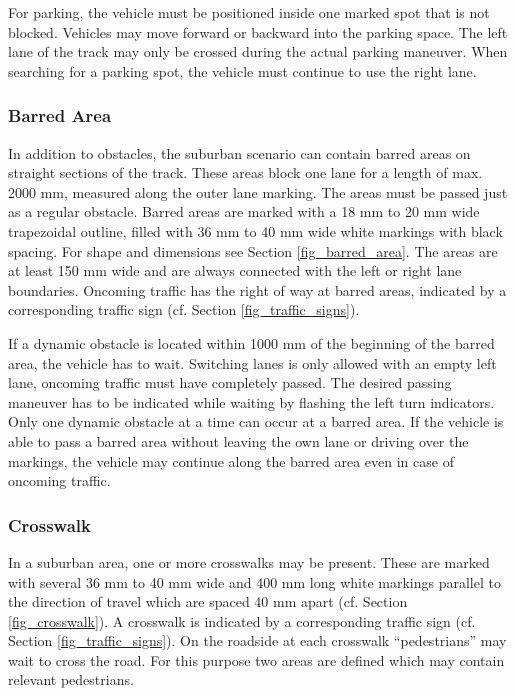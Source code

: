 For parking, the vehicle must be positioned inside one marked spot that is not
blocked. Vehicles may move forward or backward into the parking space. The left
lane of the track may only be crossed during the actual parking maneuver. When
searching for a parking spot, the vehicle must continue to use the right lane.

\subsubsection{Barred Area}

In addition to obstacles, the suburban scenario can contain barred areas on
straight sections of the track. These areas block one lane for a length of max.
2000 mm, measured along the outer lane marking. The areas must be passed just
as a regular obstacle. Barred areas are marked with a 18 mm to 20 mm wide
trapezoidal outline, filled with 36 mm to 40 mm wide white markings with black
spacing. For shape and dimensions see Section \ref{fig_barred_area}. The areas
are at least 150 mm wide and are always connected with the left or right lane
boundaries. Oncoming traffic has the right of way at barred areas, indicated by
a corresponding traffic sign (cf. Section \ref{fig_traffic_signs}).

If a dynamic obstacle is located within 1000 mm of the beginning of the barred
area, the vehicle has to wait. Switching lanes is only allowed with an empty
left lane, oncoming traffic must have completely passed. The desired passing
maneuver has to be indicated while waiting by flashing the left turn
indicators. Only one dynamic obstacle at a time can occur at a barred area. If
the vehicle is able to pass a barred area without leaving the own lane or
driving over the markings, the vehicle may continue along the barred area even
in case of oncoming traffic.

\subsubsection{Crosswalk}

In a suburban area, one or more crosswalks may be present. These are marked
with several 36 mm to 40 mm wide and 400 mm long white markings parallel to the
direction of travel which are spaced 40 mm apart (cf. Section
\ref{fig_crosswalk}). A crosswalk is indicated by a corresponding traffic sign
(cf. Section \ref{fig_traffic_signs}). On the roadside at each crosswalk
“pedestrians” may wait to cross the road. For this purpose two areas are
defined which may contain relevant pedestrians.

